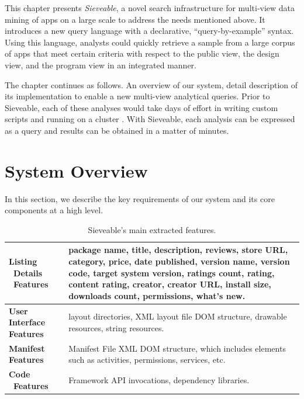 This chapter presents \emph{Sieveable}, a novel search infrastructure for multi-view data mining of apps on a large scale to address the needs mentioned above.
It introduces a new query language with a declarative, ``query-by-example'' syntax.
Using this language, analysts could quickly retrieve a sample from a large corpus of apps that meet certain criteria with respect to the public view, the design view, and the program view in an integrated manner.

The chapter continues as follows. An overview of our system, detail description of its implementation to enable a new multi-view analytical queries.
Prior to Sieveable, each of these analyses would take days of effort in writing custom scripts and running on a cluster \cite{Alharbi_2015_MobileHCI}.
With Sieveable, each analysis can be expressed as a query and results can be obtained in a matter of minutes.

\section{System Overview}
In this section, we describe the key requirements of our system and its core components at a high level.

\begin{table}[t]
	\def\arraystretch{2}
	\centering
	\begin{tabular}{|>{\raggedright}p{2cm}|p{12.5cm}|}
		\hline
		\textbf{Listing \ Details \ Features} &
		package name, title, description, reviews, store URL, category, price, date published, version name, version code, target system version, ratings count, rating, content rating, creator, creator URL, install size, downloads count, permissions, what's new.\\
		\hline
		\textbf{User Interface Features} &
		layout directories, XML layout file DOM structure, drawable resources, string resources.\\
		\hline
		\textbf{Manifest Features}&
		Manifest File XML DOM structure, which includes elements such as activities, permissions, services, etc.\\
		\hline
		\textbf{Code \ Features} & 
		Framework API invocations, dependency libraries.\\
		\hline
	\end{tabular}
	\caption{Sieveable's main extracted features.}
	\label{tab:table_features}
\end{table}

